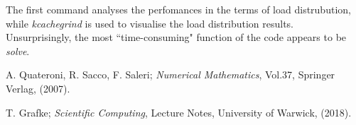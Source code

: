 \documentclass[11pt]{article}
\theoremstyle{theorem}
\theoremstyle{definition}
\begin{document}
The first command analyses the perfomances in the terms of load distrubution, while \emph{kcachegrind} is used to visualise the load distribution results.\\
Unsurprisingly, the most ``time-consuming" function of the code appears to be \emph{solve}.\\


\cleardoublepage
\begin{thebibliography}{99}

 A. Quateroni, R. Sacco, F. Saleri;
\emph{Numerical Mathematics}, Vol.37, Springer Verlag, (2007).

 T. Grafke;
\emph{Scientific Computing}, Lecture Notes, University of Warwick, (2018).







\printindex
\end{thebibliography}
\end{document}
